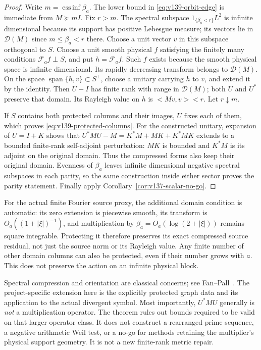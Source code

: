 \documentclass[11pt]{article}
\def\ip#1#2{<#1,#2>}%
\theoremstyle{remark}
\newcommand{\ip}[2]{\left\langle #1,#2\right\rangle}
\begin{document}
\begin{proof}
Write $m=\operatorname*{ess\,inf}\beta_a$. The lower bound in
\eqref{eq:v139-orbit-edge} is immediate from $M\succeq mI$.
Fix $r>m$. The spectral subspace $1_{\{\beta_a<r\}}L^2$ is
infinite dimensional because its support has positive Lebesgue measure;
its vectors lie in $\mathcal D(M)$ since $m\le\beta_a<r$ there.
Choose a unit vector $v$ in this subspace orthogonal to $S$.
Choose a unit smooth physical $f$ satisfying the finitely many
conditions $\mathcal F_af\perp S$, and put $h=\mathcal F_af$.
Such $f$ exists because the smooth physical space is infinite
dimensional. Its rapidly decreasing transform belongs to
$\mathcal D(M)$. On the space $\operatorname{span}\{h,v\}\subset
S^\perp$, choose a unitary carrying $h$ to $v$, and extend it by the
identity. Then $U-I$ has finite rank with range in $\mathcal D(M)$;
both $U$ and $U^*$ preserve that domain. Its Rayleigh value on $h$
is $\ip{Mv}v<r$. Let $r\downarrow m$.

If $S$ contains both protected columns and their images, $U$ fixes
each of them, which proves \eqref{eq:v139-protected-columns}.
For the constructed unitary, expansion of $U=I+K$ shows that
$U^*MU-M=K^*M+MK+K^*MK$ extends to a bounded finite-rank
self-adjoint perturbation: $MK$ is bounded and $K^*M$ is its
adjoint on the original domain. Thus the compressed forms also
keep their original domain. Evenness of $\beta_a$ leaves infinite
dimensional negative spectral subspaces in each parity, so the same
construction inside either sector proves the parity statement.
Finally apply Corollary~\ref{cor:v137-scalar-no-go}.
\end{proof}

For the actual finite Fourier source proxy, the additional domain
condition is automatic: its zero extension is piecewise smooth,
its transform is $O_a((1+|\xi|)^{-1})$, and multiplication by
$\beta_a=O_a(\log(2+|\xi|))$ remains square integrable. Protecting
it therefore preserves its exact compressed source residual, not
just the source norm or its Rayleigh value. Any finite number of
other domain columns can also be protected, even if their number
grows with $a$. This does not preserve the action on an infinite
physical block.

Spectral compression and orientation are classical concerns; see
Fan--Pall~\cite{FanPall1957}. The project-specific extension here is
the explicitly protected graph data and its application to the
actual divergent symbol. Most importantly, $U^*MU$ generally is
\emph{not} a multiplication operator. The theorem rules out bounds
required to be valid on that larger operator class. It does not
construct a rearranged prime sequence, a negative arithmetic Weil
test, or a no-go for methods retaining the multiplier's physical
support geometry. It is not a new finite-rank metric repair.
\end{document}

